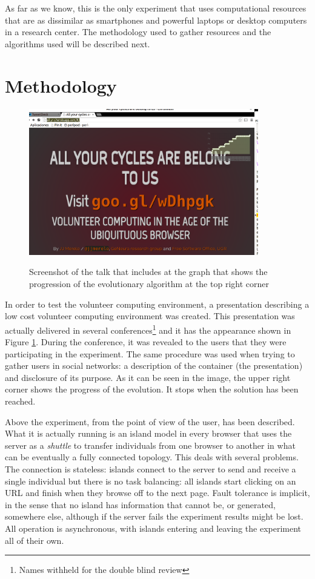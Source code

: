 \documentclass{sig-alternate}
\begin{document}
As far as we know, this is the only experiment that uses computational
resources that are as dissimilar as smartphones and powerful laptops
or desktop computers in a research center. The methodology used to
gather resources and the algorithms used will be described next. 

\section{Methodology}
\label{sec:exp}

\begin{figure}[h!tb]
  \centering
  \includegraphics[trim=0cm 2cm 0cm 3cm, width=10cm]{img/screenshot.png}
  \label{fig:sshot}
  \caption{Screenshot of the talk that includes at the graph
    that shows the progression of the evolutionary
    algorithm at the top right corner}
\end{figure}

In order to test the volunteer computing environment, a presentation
describing a low cost volunteer computing environment was
created. This presentation was actually delivered in several
conferences\footnote{Names withheld for the double blind review} and
it has the appearance shown in Figure \ref{fig:sshot}. During the
conference, it was revealed to the users that they were participating
in the experiment. The same procedure was used when trying to gather
users in social networks: a description of the container (the
presentation) and disclosure of its purpose. As it can be seen in the
image, the upper right corner shows the progress of the evolution. It
stops when the solution has been reached. 

Above the experiment, from the point of view of the user, has been
described. What it is actually running is an island model
\cite{muhlenbein1991parallel} in every browser that uses the server as
a {\em shuttle} to transfer individuals from one browser to another in
what can be eventually a fully connected topology. This deals with
several problems. The connection is stateless: islands connect to the
server to send and receive a single individual but there is no task
balancing: all islands start clicking on an URL and finish when they
browse off to the next page. Fault tolerance is implicit, in the sense
that no island has information that cannot be, or generated, somewhere
else, although if the server fails the experiment results might be
lost. All operation is asynchronous, with islands entering and leaving
the experiment all of their own. 
\end{document}
